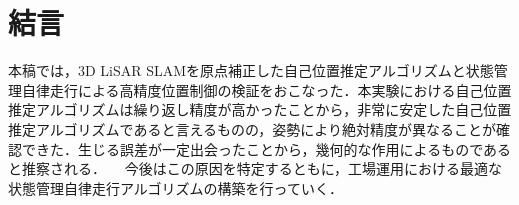 \section{結言}
本稿では，3D LiSAR SLAMを原点補正した自己位置推定アルゴリズムと状態管理自律走行による高精度位置制御の検証をおこなった．本実験における自己位置推定アルゴリズムは繰り返し精度が高かったことから，非常に安定した自己位置推定アルゴリズムであると言えるものの，姿勢により絶対精度が異なることが確認できた．生じる誤差が一定出会ったことから，幾何的な作用によるものであると推察される．
　今後はこの原因を特定するともに，工場運用における最適な状態管理自律走行アルゴリズムの構築を行っていく．
